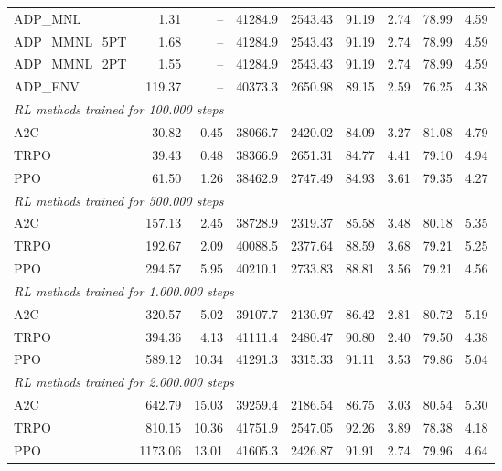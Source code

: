 \begin{samepage}
\begin{center}
\begin{tabular}{l|rr|rr|rr|rr}
    \midrule
    ADP\_MNL     &     1.31 &    -- &    41284.9 &    2543.43 &   91.19 &    2.74 &   78.99 &    4.59 \\
    ADP\_MMNL\_5PT &     1.68 &    -- &    41284.9 &    2543.43 &   91.19 &    2.74 &   78.99 &    4.59 \\
    ADP\_MMNL\_2PT &     1.55 &    -- &    41284.9 &    2543.43 &   91.19 &    2.74 &   78.99 &    4.59 \\
    ADP\_ENV     &   119.37 &    -- &    40373.3 &    2650.98 &   89.15 &    2.59 &   76.25 &    4.38 \\
    \midrule
    \multicolumn{9}{l}{\textit{RL methods trained for 100.000 steps}} \\
    \midrule
    A2C          &    30.82 &     0.45 &    38066.7 &    2420.02 &   84.09 &    3.27 &   81.08 &    4.79 \\
    TRPO         &    39.43 &     0.48 &    38366.9 &    2651.31 &   84.77 &    4.41 &   79.10 &    4.94 \\
    PPO          &    61.50 &     1.26 &    38462.9 &    2747.49 &   84.93 &    3.61 &   79.35 &    4.27 \\
    \midrule
    \multicolumn{9}{l}{\textit{RL methods trained for 500.000 steps}} \\
    \midrule
    A2C          &   157.13 &     2.45 &    38728.9 &    2319.37 &   85.58 &    3.48 &   80.18 &    5.35 \\
    TRPO         &   192.67 &     2.09 &    40088.5 &    2377.64 &   88.59 &    3.68 &   79.21 &    5.25 \\
    PPO          &   294.57 &     5.95 &    40210.1 &    2733.83 &   88.81 &    3.56 &   79.21 &    4.56 \\
    \midrule
    \multicolumn{9}{l}{\textit{RL methods trained for 1.000.000 steps}} \\
    \midrule
    A2C          &   320.57 &     5.02 &    39107.7 &    2130.97 &   86.42 &    2.81 &   80.72 &    5.19 \\
    TRPO         &   394.36 &     4.13 &    41111.4 &    2480.47 &   90.80 &    2.40 &   79.50 &    4.38 \\
    PPO          &   589.12 &    10.34 &    41291.3 &    3315.33 &   91.11 &    3.53 &   79.86 &    5.04 \\
    \midrule
    \multicolumn{9}{l}{\textit{RL methods trained for 2.000.000 steps}} \\
    \midrule
    A2C          &   642.79 &    15.03 &    39259.4 &    2186.54 &   86.75 &    3.03 &   80.54 &    5.30 \\
    TRPO         &   810.15 &    10.36 &    41751.9 &    2547.05 &   92.26 &    3.89 &   78.38 &    4.18 \\
    PPO          &  1173.06 &    13.01 &    41605.3 &    2426.87 &   91.91 &    2.74 &   79.96 &    4.64 \\
    \bottomrule
  \end{tabular}
\end{center}
\end{samepage}

